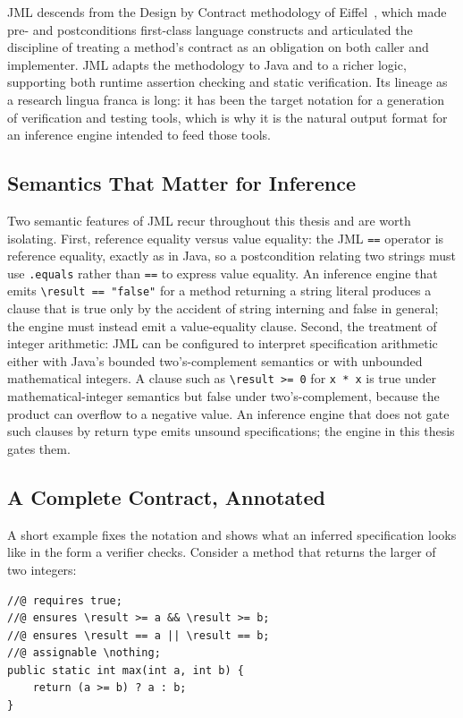 JML descends from the Design by Contract methodology of
Eiffel~\cite{meyer1992design}, which made pre- and postconditions
first-class language constructs and articulated the discipline of treating a
method's contract as an obligation on both caller and implementer. JML adapts
the methodology to Java and to a richer logic, supporting both runtime
assertion checking and static verification. Its lineage as a research lingua
franca is long: it has been the target notation for a generation of
verification and testing tools, which is why it is the natural output format
for an inference engine intended to feed those tools.

\subsection{Semantics That Matter for Inference}

Two semantic features of JML recur throughout this thesis and are worth
isolating. First, reference equality versus value equality: the JML
\texttt{==} operator is reference equality, exactly as in Java, so a
postcondition relating two strings must use \texttt{.equals} rather than
\texttt{==} to express value equality. An inference engine that emits
\texttt{\textbackslash result == "false"} for a method returning a string
literal produces a clause that is true only by the accident of string
interning and false in general; the engine must instead emit a value-equality
clause. Second, the treatment of integer arithmetic: JML can be configured to
interpret specification arithmetic either with Java's bounded two's-complement
semantics or with unbounded mathematical integers. A clause such as
\texttt{\textbackslash result >= 0} for \texttt{x * x} is true under
mathematical-integer semantics but false under two's-complement, because the
product can overflow to a negative value. An inference engine that does not
gate such clauses by return type emits unsound specifications; the engine in
this thesis gates them.

\subsection{A Complete Contract, Annotated}

A short example fixes the notation and shows what an inferred specification
looks like in the form a verifier checks. Consider a method that returns the
larger of two integers:

\begin{lstlisting}
//@ requires true;
//@ ensures \result >= a && \result >= b;
//@ ensures \result == a || \result == b;
//@ assignable \nothing;
public static int max(int a, int b) {
    return (a >= b) ? a : b;
}
\end{lstlisting}

